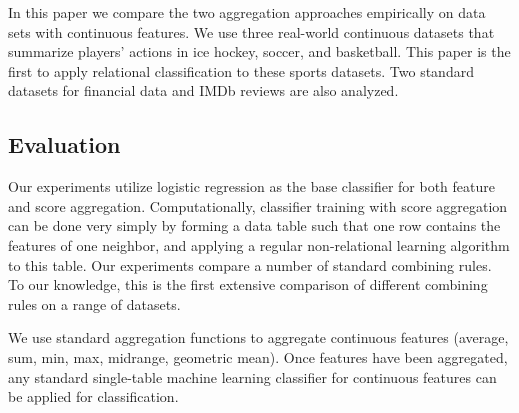 \documentclass[conference]{IEEEtran}
\begin{document}
%
In this paper we compare the two aggregation approaches empirically on data sets with continuous features. We  use three real-world continuous datasets that summarize players' actions in ice hockey, soccer, and basketball. This paper is the first to apply relational classification to these sports datasets.
Two standard datasets for financial data and IMDb reviews are also analyzed.


\subsection{Evaluation}
Our experiments utilize logistic regression as the base classifier for both feature and score aggregation.
Computationally, classifier training with score aggregation can be done very simply by forming a data table such that one row contains the features of one neighbor, and applying a regular non-relational learning algorithm to this table. Our experiments compare a number of standard combining rules. To our knowledge, this is the first extensive comparison of different combining rules on a range of datasets.

We use standard aggregation functions to aggregate continuous features (average, sum, min, max, midrange, geometric mean). Once features have been aggregated, any standard single-table machine learning classifier for continuous features can be applied for classification.


\end{document}
